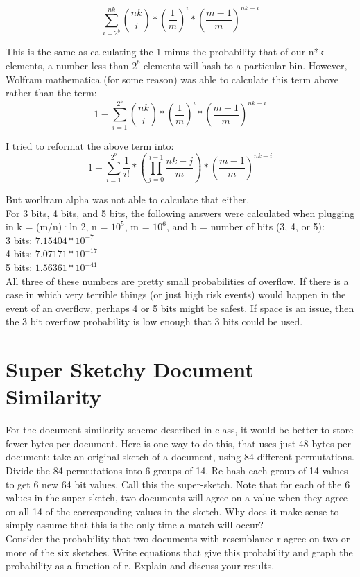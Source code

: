 \documentclass[11pt, solution, letterpaper]{format}
\begin{document}
$$\sum_{i=2^b}^{nk} {nk \choose i}*(\frac{1}{m})^i*(\frac{m-1}{m})^{nk-i}$$

This is the same as calculating the 1 minus the probability that of our n*k elements, a number less than $2^b$ elements will hash to a particular bin.  However, Wolfram mathematica (for some reason) was able to calculate this term above rather than the term:
$$1 - \sum_{i=1}^{2^b} {nk \choose i}*(\frac{1}{m})^i*(\frac{m-1}{m})^{nk-i}$$

I tried to reformat the above term into:
$$1 - \sum_{i=1}^{2^b} \frac{1}{i!} * (\prod_{j = 0}^{i - 1} \frac{nk - j}{m})*(\frac{m-1}{m})^{nk-i}$$

But worlfram alpha was not able to calculate that either.\\

For 3 bits, 4 bits, and 5 bits, the following answers were calculated when plugging in k = (m/n)·ln 2, n = $10^5$, m = $10^6$, and b = number of bits (3, 4, or 5): \\
3 bits: $7.15404*10^{-7}$\\
4 bits: $7.07171 * 10^{-17}$\\
5 bits: $1.56361 * 10^{-41}$\\

All three of these numbers are pretty small probabilities of overflow. If there is a case in which very terrible things (or just high risk events) would happen in the event of an overflow, perhaps 4 or 5 bits might be safest. If space is an issue, then the 3 bit overflow probability is low enough that 3 bits could be used. 

\clearpage
\section{Super Sketchy Document Similarity}
For the document similarity scheme described in class, it would be better to store fewer bytes per document.
Here is one way to do this, that uses just 48 bytes per document: take an original sketch of a document, using
84 different permutations. Divide the 84 permutations into 6 groups of 14. Re-hash each group of 14 values to
get 6 new 64 bit values. Call this the super-sketch. Note that for each of the 6 values in the super-sketch, two
documents will agree on a value when they agree on all 14 of the corresponding values in the sketch. Why
does it make sense to simply assume that this is the only time a match will occur?\\

Consider the probability that two documents with resemblance r agree on two or more of the six sketches.
Write equations that give this probability and graph the probability as a function of r. Explain and discuss
your results.\\
\end{document}
